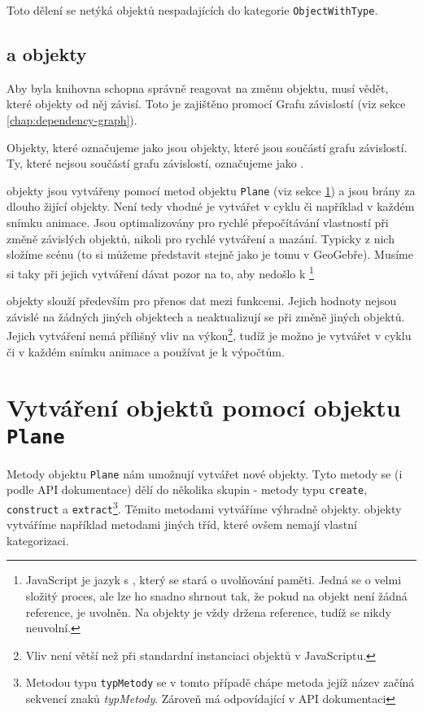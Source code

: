 Toto dělení se netýká objektů nespadajících do kategorie \texttt{ObjectWithType}.

\subsection[Bound a Unbound]{ a  objekty}
\label{subsec:bound-and-unbound}

Aby byla knihovna schopna správně reagovat na změnu objektu, musí vědět, které objekty od něj závisí.
Toto je zajištěno promocí Grafu závislostí (viz sekce \ref{chap:dependency-graph}).

Objekty, které označujeme jako  jsou objekty, které jsou součástí grafu závislostí.
Ty, které nejsou součástí grafu závislostí, označujeme jako .

 objekty jsou vytvářeny pomocí metod objektu \texttt{Plane} (viz sekce \ref{sec:creating-objects}) a jsou brány za dlouho žijící objekty. 
Není tedy vhodné je vytvářet v cyklu či například v každém snímku animace.
Jsou optimalizovány pro rychlé přepočítávání vlastností při změně závislých objektů, nikoli pro rychlé vytváření a mazání.
Typicky z nich složíme scénu (to si můžeme představit stejně jako je tomu v GeoGebře).
Musíme si taky při jejich vytváření dávat pozor na to, aby nedošlo k \footnote{JavaScript je jazyk s \cite{mdn:memory-management}, který se stará o uvolňování paměti. Jedná se o velmi složitý proces, ale lze ho snadno shrnout tak, že pokud na objekt není žádná reference, je uvolněn. Na  objekty je vždy držena reference, tudíž se nikdy neuvolní.} 

 objekty slouží především pro přenos dat mezi funkcemi. 
Jejich hodnoty nejsou závislé na žádných jiných objektech a neaktualizují se při změně jiných objektů.
Jejich vytváření nemá přílišný vliv na výkon\footnote{Vliv není větší než při standardní instanciaci objektů v JavaScriptu.}, tudíž je možno je vytvářet v cyklu či v každém snímku animace a používat je k výpočtům.\cite[volný překlad]{geometryjs:wiki:geometryObjects}


\section[Vytváření]{Vytváření objektů pomocí objektu \texttt{Plane}}
\label{sec:creating-objects}

Metody objektu \texttt{Plane} nám umožnují vytvářet nové objekty. 
Tyto metody se (i podle API dokumentace) dělí do několika skupin - metody typu \texttt{create}, \texttt{construct} a \texttt{extract}\footnote{Metodou typu \texttt{typMetody} se v tomto případě chápe metoda jejíž název začíná sekvencí znaků \textit{typMetody}. Zároveň má odpovídající  v API dokumentaci}\cite{geometryjs:wiki:geometryObjects}.
Těmito metodami vytváříme výhradně  objekty. 
 objekty vytváříme například metodami jiných tříd, které ovšem nemají vlastní kategorizaci.

